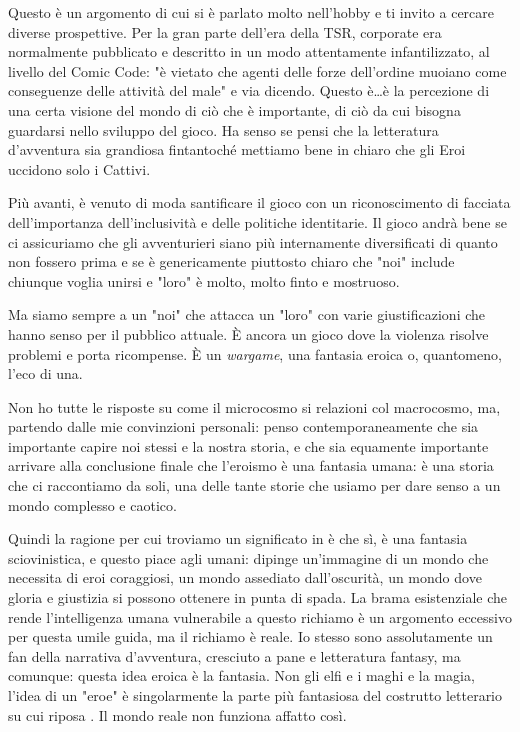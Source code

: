 Questo è un argomento di cui si è parlato molto nell'hobby e ti invito a cercare diverse prospettive. Per la gran parte dell'era della TSR, \dnd{} corporate era normalmente pubblicato e descritto in un modo attentamente infantilizzato, al livello del Comic Code: "è vietato che agenti delle forze dell'ordine muoiano come conseguenze delle attività del male" e via dicendo. Questo è\dots è la percezione di una certa visione del mondo di ciò che è importante, di ciò da cui bisogna guardarsi nello sviluppo del gioco. Ha senso se pensi che la letteratura d'avventura sia grandiosa fintantoché mettiamo bene in chiaro che gli Eroi uccidono solo i Cattivi.

Più avanti, è venuto di moda santificare il gioco con un riconoscimento di facciata dell'importanza dell'inclusività e delle politiche identitarie. Il gioco andrà bene se ci assicuriamo che gli avventurieri siano più internamente diversificati di quanto non fossero prima e se è genericamente piuttosto chiaro che "noi" include chiunque voglia unirsi e "loro" è molto, molto finto e mostruoso.

Ma siamo sempre a un "noi" che attacca un "loro" con varie giustificazioni che hanno senso per il pubblico attuale. È ancora un gioco dove la violenza risolve problemi e porta ricompense. È un \textit{wargame}, una fantasia eroica o, quantomeno, l'eco di una.


Non ho tutte le risposte su come il microcosmo si relazioni col macrocosmo, ma, partendo dalle mie convinzioni personali: penso contemporaneamente che sia importante capire noi stessi e la nostra storia, e che sia equamente importante arrivare alla conclusione finale che l'eroismo è una fantasia umana: è una storia che ci raccontiamo da soli, una delle tante storie che usiamo per dare senso a un mondo complesso e caotico.

Quindi la ragione per cui troviamo un significato in \dnd{} è che sì, è una fantasia sciovinistica, e questo piace agli umani: dipinge un'immagine di un mondo che necessita di eroi coraggiosi, un mondo assediato dall'oscurità, un mondo dove gloria e giustizia si possono ottenere in punta di spada. La brama esistenziale che rende l'intelligenza umana vulnerabile a questo richiamo è un argomento eccessivo per questa umile guida, ma il richiamo è reale. Io stesso sono assolutamente un fan della narrativa d'avventura, cresciuto a pane e letteratura fantasy, ma comunque: questa idea eroica è la fantasia. Non gli elfi e i maghi e la magia, l'idea di un "eroe" è singolarmente la parte più fantasiosa del costrutto letterario su cui riposa \dnd{}. Il mondo reale non funziona affatto così.

